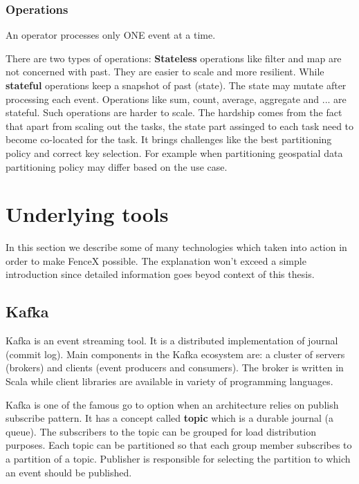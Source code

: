 \documentclass[a4]{report}
\begin{document}
        \subsubsection{Operations}
        An operator processes only ONE event at a time.

        There are two types of operations:
        \textbf{Stateless} operations like filter and map are not concerned with past.
        They are easier to scale and more resilient.
        While \textbf{stateful} operations keep a snapshot of past (state).
        The state may mutate after processing each event.
        Operations like sum, count, average, aggregate and ... are stateful.
        Such operations are harder to scale.
        The hardship comes from the fact that apart from scaling out the tasks, the state part assinged to each task need
        to become co-located for the task.
        It brings challenges like the best partitioning policy and correct key selection.
        For example when partitioning geospatial data partitioning policy may differ based on the use case.

        \section{Underlying tools}
        In this section we describe some of many technologies which taken into action in order to make FenceX possible.
        The explanation won't exceed a simple introduction since detailed information goes beyod context of this thesis.

        \subsection{Kafka \cite{kafka}}
        Kafka is an event streaming tool.
        It is a distributed implementation of journal (commit log).
        Main components in the Kafka ecosystem are: a cluster of servers (brokers) and clients (event producers and consumers).
        The broker is written in Scala while client libraries are available in variety of programming languages.

        Kafka is one of the famous go to option when an architecture relies on publish subscribe pattern.
        It has a concept called \textbf{topic} which is a durable journal (a queue).
        The subscribers to the topic can be grouped for load distribution purposes.
        Each topic can be partitioned so that each group member subscribes to a partition of a topic.
        Publisher is responsible for selecting the partition to which an event should be published.
\end{document}
